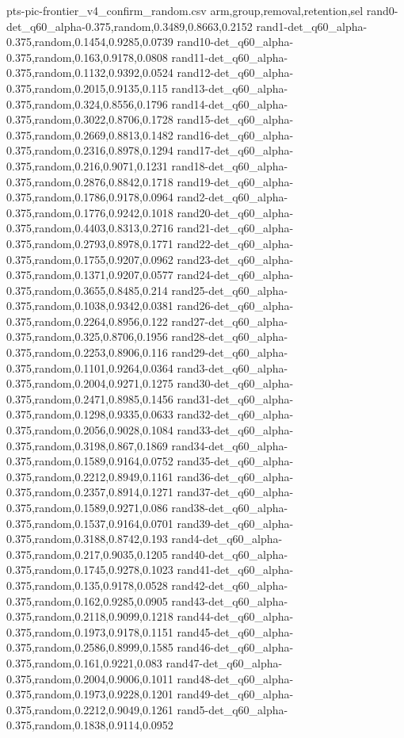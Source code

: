 \begin{filecontents*}[overwrite]{pts-pic-frontier_v4_confirm_random.csv}
arm,group,removal,retention,sel
rand0-det_q60_alpha-0.375,random,0.3489,0.8663,0.2152
rand1-det_q60_alpha-0.375,random,0.1454,0.9285,0.0739
rand10-det_q60_alpha-0.375,random,0.163,0.9178,0.0808
rand11-det_q60_alpha-0.375,random,0.1132,0.9392,0.0524
rand12-det_q60_alpha-0.375,random,0.2015,0.9135,0.115
rand13-det_q60_alpha-0.375,random,0.324,0.8556,0.1796
rand14-det_q60_alpha-0.375,random,0.3022,0.8706,0.1728
rand15-det_q60_alpha-0.375,random,0.2669,0.8813,0.1482
rand16-det_q60_alpha-0.375,random,0.2316,0.8978,0.1294
rand17-det_q60_alpha-0.375,random,0.216,0.9071,0.1231
rand18-det_q60_alpha-0.375,random,0.2876,0.8842,0.1718
rand19-det_q60_alpha-0.375,random,0.1786,0.9178,0.0964
rand2-det_q60_alpha-0.375,random,0.1776,0.9242,0.1018
rand20-det_q60_alpha-0.375,random,0.4403,0.8313,0.2716
rand21-det_q60_alpha-0.375,random,0.2793,0.8978,0.1771
rand22-det_q60_alpha-0.375,random,0.1755,0.9207,0.0962
rand23-det_q60_alpha-0.375,random,0.1371,0.9207,0.0577
rand24-det_q60_alpha-0.375,random,0.3655,0.8485,0.214
rand25-det_q60_alpha-0.375,random,0.1038,0.9342,0.0381
rand26-det_q60_alpha-0.375,random,0.2264,0.8956,0.122
rand27-det_q60_alpha-0.375,random,0.325,0.8706,0.1956
rand28-det_q60_alpha-0.375,random,0.2253,0.8906,0.116
rand29-det_q60_alpha-0.375,random,0.1101,0.9264,0.0364
rand3-det_q60_alpha-0.375,random,0.2004,0.9271,0.1275
rand30-det_q60_alpha-0.375,random,0.2471,0.8985,0.1456
rand31-det_q60_alpha-0.375,random,0.1298,0.9335,0.0633
rand32-det_q60_alpha-0.375,random,0.2056,0.9028,0.1084
rand33-det_q60_alpha-0.375,random,0.3198,0.867,0.1869
rand34-det_q60_alpha-0.375,random,0.1589,0.9164,0.0752
rand35-det_q60_alpha-0.375,random,0.2212,0.8949,0.1161
rand36-det_q60_alpha-0.375,random,0.2357,0.8914,0.1271
rand37-det_q60_alpha-0.375,random,0.1589,0.9271,0.086
rand38-det_q60_alpha-0.375,random,0.1537,0.9164,0.0701
rand39-det_q60_alpha-0.375,random,0.3188,0.8742,0.193
rand4-det_q60_alpha-0.375,random,0.217,0.9035,0.1205
rand40-det_q60_alpha-0.375,random,0.1745,0.9278,0.1023
rand41-det_q60_alpha-0.375,random,0.135,0.9178,0.0528
rand42-det_q60_alpha-0.375,random,0.162,0.9285,0.0905
rand43-det_q60_alpha-0.375,random,0.2118,0.9099,0.1218
rand44-det_q60_alpha-0.375,random,0.1973,0.9178,0.1151
rand45-det_q60_alpha-0.375,random,0.2586,0.8999,0.1585
rand46-det_q60_alpha-0.375,random,0.161,0.9221,0.083
rand47-det_q60_alpha-0.375,random,0.2004,0.9006,0.1011
rand48-det_q60_alpha-0.375,random,0.1973,0.9228,0.1201
rand49-det_q60_alpha-0.375,random,0.2212,0.9049,0.1261
rand5-det_q60_alpha-0.375,random,0.1838,0.9114,0.0952

\end{filecontents*}
